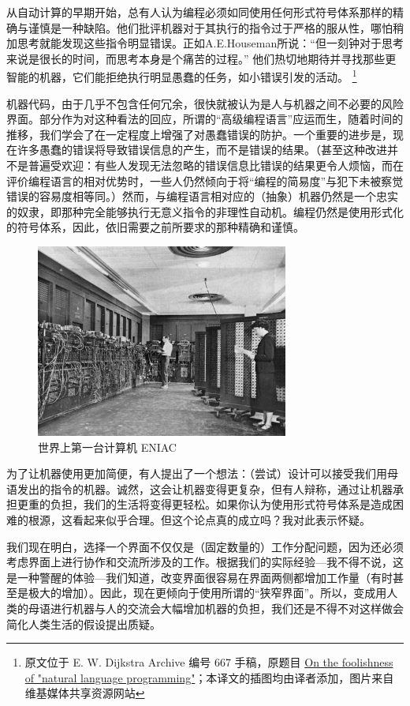 \documentclass[a4paper,12pt]{article}
\begin{document}
从自动计算的早期开始，总有人认为编程必须如同使用任何形式符号体系那样的精确与谨慎是一种缺陷。他们批评机器对于其执行的指令过于严格的服从性，哪怕稍加思考就能发现这些指令明显错误。正如A.E.Houseman所说：“但一刻钟对于思考来说是很长的时间，而思考本身是个痛苦的过程。” 他们热切地期待并寻找那些更智能的机器，它们能拒绝执行明显愚蠢的任务，如小错误引发的活动。
\footnote{原文位于 E. W. Dijkstra Archive 编号 667 手稿，原题目 \href{https://www.cs.utexas.edu/users/EWD/ewd06xx/EWD667.PDF}{On the foolishness of "natural language programming"}；本译文的插图均由译者添加，图片来自维基媒体共享资源网站}

机器代码，由于几乎不包含任何冗余，很快就被认为是人与机器之间不必要的风险界面。部分作为对这种看法的回应，所谓的“高级编程语言”应运而生，随着时间的推移，我们学会了在一定程度上增强了对愚蠢错误的防护。一个重要的进步是，现在许多愚蠢的错误将导致错误信息的产生，而不是错误的结果。（甚至这种改进并不是普遍受欢迎：有些人发现无法忽略的错误信息比错误的结果更令人烦恼，而在评价编程语言的相对优势时，一些人仍然倾向于将“编程的简易度”与犯下未被察觉错误的容易度相等同。）然而，与编程语言相对应的（抽象）机器仍然是一个忠实的奴隶，即那种完全能够执行无意义指令的非理性自动机。编程仍然是使用形式化的符号体系，因此，依旧需要之前所要求的那种精确和谨慎。

\begin{figure}[ht]
\centering
\includegraphics[height=2.5in]{images/ENIAC.jpeg}
\caption{世界上第一台计算机 ENIAC}
\end{figure}

为了让机器使用更加简便，有人提出了一个想法：（尝试）设计可以接受我们用母语发出的指令的机器。诚然，这会让机器变得更复杂，但有人辩称，通过让机器承担更重的负担，我们的生活将变得更轻松。如果你认为使用形式符号体系是造成困难的根源，这看起来似乎合理。但这个论点真的成立吗？我对此表示怀疑。

我们现在明白，选择一个界面不仅仅是（固定数量的）工作分配问题，因为还必须考虑界面上进行协作和交流所涉及的工作。根据我们的实际经验—我不得不说，这是一种警醒的体验—我们知道，改变界面很容易在界面两侧都增加工作量（有时甚至是极大的增加）。因此，现在更倾向于使用所谓的“狭窄界面”。所以，变成用人类的母语进行机器与人的交流会大幅增加机器的负担，我们还是不得不对这样做会简化人类生活的假设提出质疑。
\end{document}

